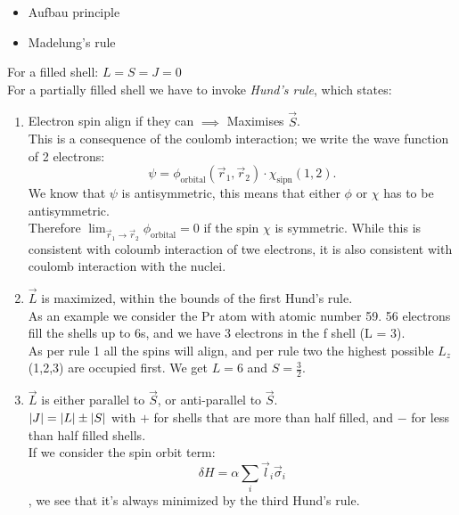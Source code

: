 \documentclass{report}
\begin{document}
\begin{itemize}
	\item Aufbau principle
	\item Madelung's rule
\end{itemize}
For a filled shell:  $L = S = J = 0$ \\
For a partially filled shell we have to invoke \emph{Hund's rule}, which states: 
\begin{enumerate}
	\item Electron spin align if they can $\implies$ Maximises $\vec{S}$.\\
		This is a consequence of the coulomb interaction; we write the wave function of 2 electrons: \[
			\psi = \phi_\text{orbital}(\vec{r}_1, \vec{r}_2) \cdot \chi_\text{sipn}\left( 1,2 \right) 
		.\] We know that $\psi $ is antisymmetric, this means that either $\phi$ or $\chi$ has to be antisymmetric.\\
		Therefore $\lim_{\vec{r}_1 \to \vec{r}_2} \phi_\text{orbital} = 0 $ if the spin $\chi$ is symmetric. While this is consistent with coloumb interaction of twe electrons, it is also consistent with coulomb interaction with the nuclei.
	\item $\vec{L}$ is maximized, within the bounds of the first Hund's rule. \\
		As an example we consider the Pr atom with atomic number 59. 56 electrons fill the shells up to 6s, and we have 3 electrons in the f shell (L = 3). \\
		As per rule 1 all the spins will align, and per rule two the highest possible $L_z$ (1,2,3) are occupied first. We get $L = 6$ and $S = \frac{3}{2}$.
	\item $\vec{L}$ is either parallel to  $\vec{S}$, or anti-parallel to $\vec{S}$.\\
		$\abs{J} = \abs{L} \pm \abs{S}$ with $+$ for shells that are more than half filled,  and $-$ for less than half filled shells.\\
		If we consider the spin orbit term: \[
			\delta H = \alpha \sum_{i} \vec{l}_i \vec{\sigma}_i
		\], we see that it's always minimized by the third Hund's rule.
\end{enumerate}
\end{document}
